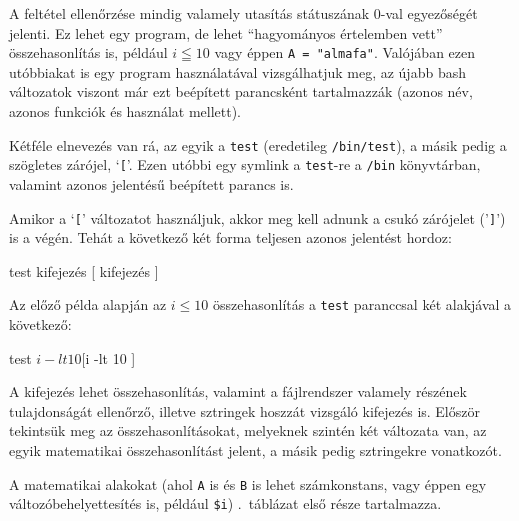 A feltétel ellenőrzése mindig valamely utasítás státuszának 0-val egyezőségét
jelenti. Ez lehet egy program, de lehet ``hagyományos értelemben vett''
összehasonlítás is, például  $i \leqq 10$ vagy éppen \texttt{A =
  "almafa"}. Valójában ezen utóbbiakat is egy program használatával
vizsgálhatjuk meg, az újabb bash változatok viszont már ezt beépített
parancsként tartalmazzák (azonos név, azonos funkciók és használat mellett).

Kétféle elnevezés van rá, az egyik a \texttt{test} (eredetileg
\texttt{/bin/test}), a másik pedig a szögletes zárójel, `\texttt{[}'. Ezen
utóbbi egy symlink a \texttt{test}-re a \texttt{/bin} könyvtárban, valamint
azonos jelentésű beépített parancs is.

Amikor a `\texttt{[}' változatot használjuk, akkor meg kell adnunk a csukó
zárójelet ('\texttt{]}') is a végén. Tehát a következő két forma teljesen azonos
jelentést hordoz:

\begin{VerbExample}
test kifejezés
[ kifejezés ]
\end{VerbExample}

Az előző példa alapján az $i \le 10$ összehasonlítás a \texttt{test} paranccsal
két alakjával a következő:

\begin{VerbExample}
test  $i -lt 10
[  $i -lt 10 ]
\end{VerbExample}

A kifejezés lehet összehasonlítás, valamint a fájlrendszer valamely részének
tulajdonságát ellenőrző, illetve sztringek hoszzát vizsgáló kifejezés
is. Először tekintsük meg az összehasonlításokat, melyeknek szintén két
változata van, az egyik matematikai összehasonlítást jelent, a másik pedig
sztringekre vonatkozót.

A matematikai alakokat (ahol \texttt{A} is és \texttt{B} is lehet számkonstans,
vagy éppen egy változóbehelyettesítés is, például \verb|$i|)
.\ táblázat első része tartalmazza.
 
